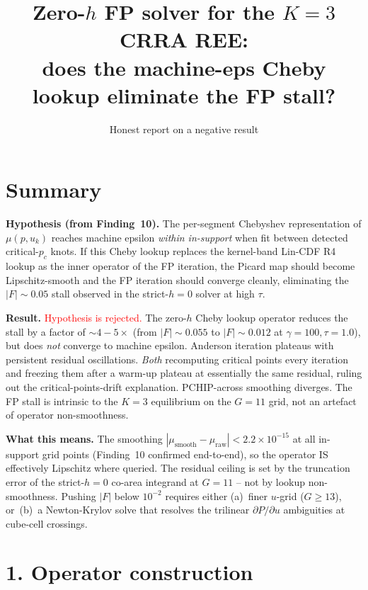 \documentclass[10pt,a4paper]{article}
\title{Zero-$h$ FP solver for the $K{=}3$ CRRA REE: \\
       \large does the machine-eps Cheby lookup eliminate the FP stall?}
\author{Honest report on a negative result}
\date{}
\begin{document}
\maketitle

\section*{Summary}

\textbf{Hypothesis (from Finding~10).} The per-segment Chebyshev representation of
$\mu(p,u_k)$ reaches machine epsilon \emph{within in-support} when fit between
detected critical-$p_c$ knots. If this Cheby lookup replaces the kernel-band
Lin-CDF R4 lookup as the inner operator of the FP iteration, the Picard map
should become Lipschitz-smooth and the FP iteration should converge cleanly,
eliminating the $|F|\!\sim\!0.05$ stall observed in the strict-$h{=}0$ solver
at high $\tau$.

\textbf{Result.} \textcolor{red}{Hypothesis is rejected.} The zero-$h$ Cheby
lookup operator reduces the stall by a factor of $\sim 4{-}5\times$
(from $|F|\!\sim\!0.055$ to $|F|\!\sim\!0.012$ at $\gamma{=}100,\tau{=}1.0$),
but does \emph{not} converge to machine epsilon. Anderson iteration plateaus
with persistent residual oscillations. \emph{Both} recomputing critical points
every iteration and freezing them after a warm-up plateau at essentially the
same residual, ruling out the critical-points-drift explanation. PCHIP-across
smoothing diverges. The FP stall is intrinsic to the $K{=}3$ equilibrium on
the $G{=}11$ grid, not an artefact of operator non-smoothness.

\textbf{What this means.} The smoothing $|\mu_\text{smooth}-\mu_\text{raw}|<
2.2\!\times\!10^{-15}$ at all in-support grid points (Finding~10 confirmed
end-to-end), so the operator IS effectively Lipschitz where queried. The
residual ceiling is set by the truncation error of the strict-$h{=}0$
co-area integrand at $G{=}11$ -- not by lookup non-smoothness. Pushing
$|F|$ below $10^{-2}$ requires either (a)~finer $u$-grid ($G\!\geq\!13$),
or~(b)~a Newton-Krylov solve that resolves the trilinear $\partial P/\partial u$
ambiguities at cube-cell crossings.

\section*{1. Operator construction}
\end{document}
